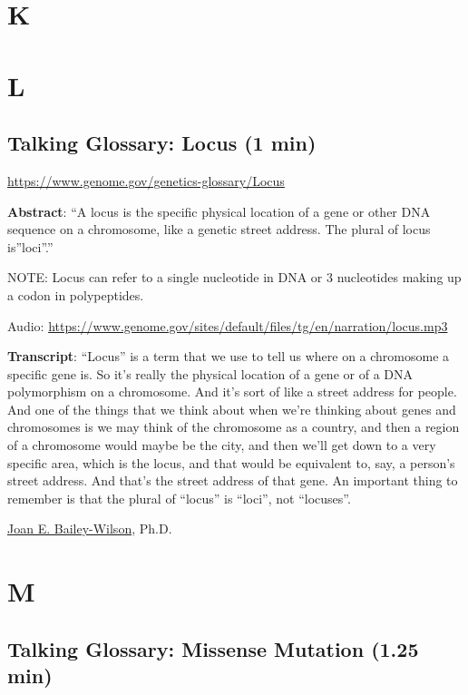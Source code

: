 \documentclass[
]{book}
\begin{document}
\hypertarget{k}{%
\chapter{K}\label{k}}

\hypertarget{l}{%
\chapter{L}\label{l}}

\hypertarget{talking-glossary-locus-1-min}{%
\section{Talking Glossary: Locus (1 min)}\label{talking-glossary-locus-1-min}}

\url{https://www.genome.gov/genetics-glossary/Locus}

\textbf{Abstract}: ``A locus is the specific physical location of a gene or other DNA sequence on a chromosome, like a genetic street address. The plural of locus is''loci''.''

NOTE: Locus can refer to a single nucleotide in DNA or 3 nucleotides making up a codon in polypeptides.

Audio: \url{https://www.genome.gov/sites/default/files/tg/en/narration/locus.mp3}

\textbf{Transcript}: ``Locus'' is a term that we use to tell us where on a chromosome a specific gene is. So it's really the physical location of a gene or of a DNA polymorphism on a chromosome. And it's sort of like a street address for people. And one of the things that we think about when we're thinking about genes and chromosomes is we may think of the chromosome as a country, and then a region of a chromosome would maybe be the city, and then we'll get down to a very specific area, which is the locus, and that would be equivalent to, say, a person's street address. And that's the street address of that gene. An important thing to remember is that the plural of ``locus'' is ``loci'', not ``locuses''.

\href{https://www.genome.gov/staff/Joan-E-Bailey-Wilson-PhD}{Joan E. Bailey-Wilson}, Ph.D.

\hypertarget{m}{%
\chapter{M}\label{m}}

\hypertarget{talking-glossary-missense-mutation-1.25-min}{%
\section{Talking Glossary: Missense Mutation (1.25 min)}\label{talking-glossary-missense-mutation-1.25-min}}
\end{document}
